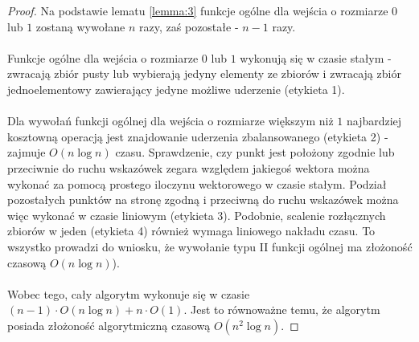 \documentclass[10pt,a4paper]{article}
\begin{document}
	\begin{proof}
		Na podstawie lematu \ref{lemma:3} funkcje ogólne dla wejścia o rozmiarze $0$ lub $1$ zostaną wywołane $n$ razy, zaś pozostałe - $n - 1$ razy. \\~\\
		Funkcje ogólne dla wejścia o rozmiarze $0$ lub $1$ wykonują się w czasie stałym - zwracają zbiór pusty lub wybierają jedyny elementy ze zbiorów i zwracają zbiór jednoelementowy zawierający jedyne możliwe uderzenie (etykieta 1).\\~\\
		Dla wywołań funkcji ogólnej dla wejścia o rozmiarze większym niż $1$ najbardziej kosztowną operacją jest znajdowanie uderzenia zbalansowanego (etykieta 2) - zajmuje $O(n \log n)$ czasu. Sprawdzenie, czy punkt jest położony zgodnie lub przeciwnie do ruchu wskazówek zegara względem jakiegoś wektora można wykonać za pomocą prostego iloczynu wektorowego w czasie stałym. Podział pozostałych punktów na stronę zgodną i przeciwną do ruchu wskazówek można więc wykonać w czasie liniowym (etykieta 3). Podobnie, scalenie rozłącznych zbiorów w jeden (etykieta 4) również wymaga liniowego nakładu czasu. To wszystko prowadzi do wniosku, że wywołanie typu II funkcji ogólnej ma złożoność czasową $O(n \log n)$).
		\\~\\
		Wobec tego, cały algorytm wykonuje się w czasie $(n - 1) \cdot O(n \log n) + n \cdot O(1)$. Jest to równoważne temu, że algorytm posiada złożoność algorytmiczną czasową $O(n^{2} \log n)$.
	\end{proof}
\end{document}
